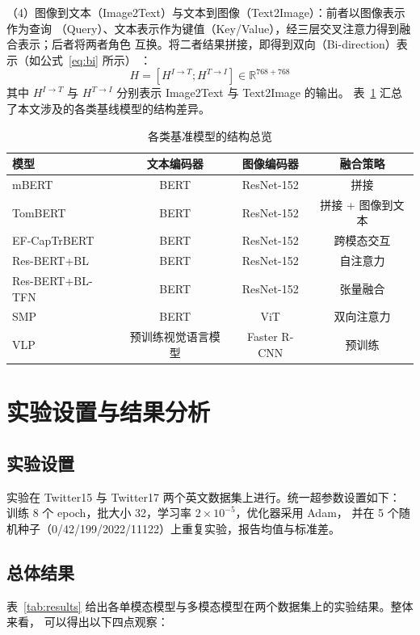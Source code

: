 \documentclass[12pt]{ctexart}
\begin{document}
（4）图像到文本（Image2Text）与文本到图像（Text2Image）：前者以图像表示作为查询
（Query）、文本表示作为键值（Key/Value），经三层交叉注意力得到融合表示；后者将两者角色
互换。将二者结果拼接，即得到双向（Bi-direction）表示（如公式~\eqref{eq:bi} 所示）
\cite{ye2023}：
\begin{equation}
  H=[H^{I\rightarrow T};H^{T\rightarrow I}]\in\mathbb{R}^{768+768}
  \label{eq:bi}
\end{equation}
其中 $H^{I\rightarrow T}$ 与 $H^{T\rightarrow I}$ 分别表示 Image2Text 与 Text2Image 的输出。
表~\ref{tab:models} 汇总了本文涉及的各类基线模型的结构差异。

\begin{table}[htbp]
\centering
\caption{各类基准模型的结构总览\cite{ye2023}}
\label{tab:models}
\small
\begin{tabular}{lccc}
\toprule
模型 & 文本编码器 & 图像编码器 & 融合策略 \\
\midrule
mBERT\cite{yu2019} & BERT & ResNet-152 & 拼接 \\
TomBERT\cite{yu2019} & BERT & ResNet-152 & 拼接 + 图像到文本 \\
EF-CapTrBERT\cite{khan2021} & BERT & ResNet-152 & 跨模态交互 \\
Res-BERT+BL\cite{ye2023} & BERT & ResNet-152 & 自注意力 \\
Res-BERT+BL-TFN\cite{ye2023} & BERT & ResNet-152 & 张量融合 \\
SMP\cite{smp2022} & BERT & ViT & 双向注意力 \\
VLP\cite{vlp2022} & 预训练视觉语言模型 & Faster R-CNN & 预训练 \\
\bottomrule
\end{tabular}
\end{table}

\clearpage
\section{实验设置与结果分析}
\subsection{实验设置}
实验在 Twitter15 与 Twitter17 两个英文数据集上进行\cite{yu2019}。统一超参数设置如下：
训练 8 个 epoch，批大小 32，学习率 $2\times10^{-5}$，优化器采用 Adam\cite{kingma2015}，
并在 5 个随机种子（0/42/199/2022/11122）上重复实验，报告均值与标准差\cite{ye2023}。

\subsection{总体结果}
表~\ref{tab:results} 给出各单模态模型与多模态模型在两个数据集上的实验结果。整体来看，
可以得出以下四点观察\cite{ye2023}：
\end{document}
